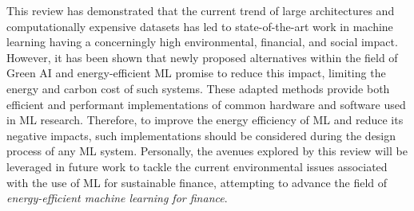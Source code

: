 \documentclass[a4paper, 12pt]{article}
\begin{document}
    This review has demonstrated that the current trend of large architectures and computationally expensive datasets has led to state-of-the-art work in machine learning having a concerningly high environmental, financial, and social impact. However, it has been shown that newly proposed alternatives within the field of Green AI and energy-efficient ML promise to reduce this impact, limiting the energy and carbon cost of such systems. These adapted methods provide both efficient and performant implementations of common hardware and software used in ML research. Therefore, to improve the energy efficiency of ML and reduce its negative impacts, such implementations should be considered during the design process of any ML system. Personally, the avenues explored by this review will be leveraged in future work to tackle the current environmental issues associated with the use of ML for sustainable finance, attempting to advance the field of \emph{energy-efficient machine learning for finance}.

    
\end{document}
